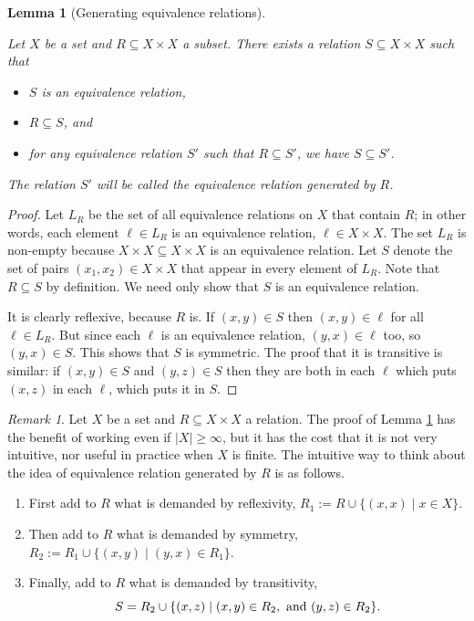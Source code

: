 \documentclass{book}
\def\tn{\textnormal}
\def\ss{\subseteq}
\def\|{{\;|\;}}
\newtheorem{lemma}[subsubsection]{Lemma}
\theoremstyle{remark}
\newtheorem{remark}[subsubsection]{Remark}
\theoremstyle{definition}
\begin{document}
\begin{lemma}[Generating equivalence relations]\label{lemma:generating ERs}

Let $X$ be a set and $R\ss X\times X$ a subset. There exists a relation $S\ss X\times X$ such that
\begin{itemize}
\item $S$ is an equivalence relation,
\item $R\ss S$, and
\item for any equivalence relation $S'$ such that $R\ss S'$, we have $S\ss S'$.
\end{itemize}
The relation $S'$ will be called {\em the equivalence relation generated by $R$}.

\end{lemma}

\begin{proof}

Let $L_R$ be the set of all equivalence relations on $X$ that contain $R$; in other words, each element $\ell\in L_R$ is an equivalence relation, $\ell\in X\times X$. The set $L_R$ is non-empty because $X\times X\ss X\times X$ is an equivalence relation. Let $S$ denote the set of pairs $(x_1,x_2)\in X\times X$ that appear in every element of $L_R$. Note that $R\ss S$ by definition. We need only show that $S$ is an equivalence relation.

It is clearly reflexive, because $R$ is. If $(x,y)\in S$ then $(x,y)\in\ell$ for all $\ell\in L_R$. But since each $\ell$ is an equivalence relation, $(y,x)\in\ell$ too, so $(y,x)\in S$. This shows that $S$ is symmetric. The proof that it is transitive is similar: if $(x,y)\in S$ and $(y,z)\in S$ then they are both in each $\ell$ which puts $(x,z)$ in each $\ell$, which puts it in $S$.

\end{proof}

\begin{remark}

Let $X$ be a set and $R\ss X\times X$ a relation. The proof of Lemma \ref{lemma:generating ERs} has the benefit of working even if $|X|\geq\infty$, but it has the cost that it is not very intuitive, nor useful in practice when $X$ is finite. The intuitive way to think about the idea of equivalence relation generated by $R$ is as follows.
\begin{enumerate}
\item First add to $R$ what is demanded by reflexivity, $R_1:=R\cup\{(x,x)\|x\in X\}$.
\item Then add to $R$ what is demanded by symmetry, $R_2:=R_1\cup\{(x,y)\|(y,x)\in R_1\}.$
\item Finally, add to $R$ what is demanded by transitivity, $$S=R_2\cup\{(x,z)\|(x,y)\in R_2, \tn{ and } (y,z)\in R_2\}.$$
\end{enumerate}

\end{remark}
\end{document}
